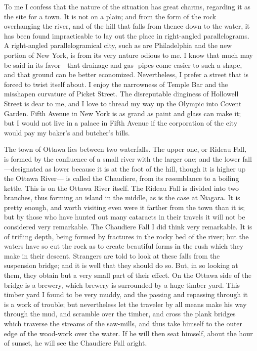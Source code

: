 To me I confess that the nature of the situation has great charms,
regarding it as the site for a town.  It is not on a plain; and
from the form of the rock overhanging the river, and of the hill
that falls from thence down to the water, it has been found
impracticable to lay out the place in right-angled parallelograms.
A right-angled parallelogramical city, such as are Philadelphia and
the new portion of New York, is from its very nature odious to me.
I know that much may be said in its favor---that drainage and gas-
pipes come easier to such a shape, and that ground can be better
economized.  Nevertheless, I prefer a street that is forced to
twist itself about.  I enjoy the narrowness of Temple Bar and the
misshapen curvature of Picket Street.  The disreputable dinginess
of Hollowell Street is dear to me, and I love to thread my way up
the Olympic into Covent Garden.  Fifth Avenue in New York is as
grand as paint and glass can make it; but I would not live in a
palace in Fifth Avenue if the corporation of the city would pay my
baker's and butcher's bills.

The town of Ottawa lies between two waterfalls.  The upper one, or
Rideau Fall, is formed by the confluence of a small river with the
larger one; and the lower fall---designated as lower because it is
at the foot of the hill, though it is higher up the Ottawa River---%
is called the Chaudiere, from its resemblance to a boiling kettle.
This is on the Ottawa River itself.  The Rideau Fall is divided
into two branches, thus forming an island in the middle, as is the
case at Niagara.  It is pretty enough, and worth visiting even were
it farther from the town than it is; but by those who have hunted
out many cataracts in their travels it will not be considered very
remarkable.  The Chaudiere Fall I did think very remarkable.  It is
of trifling depth, being formed by fractures in the rocky bed of
the river; but the waters have so cut the rock as to create
beautiful forms in the rush which they make in their descent.
Strangers are told to look at these falls from the suspension
bridge; and it is well that they should do so.  But, in so looking
at them, they obtain but a very small part of their effect.  On the
Ottawa side of the bridge is a brewery, which brewery is surrounded
by a huge timber-yard.  This timber yard I found to be very muddy,
and the passing and repassing through it is a work of trouble; but
nevertheless let the traveler by all means make his way through the
mud, and scramble over the timber, and cross the plank bridges
which traverse the streams of the saw-mills, and thus take himself
to the outer edge of the wood-work over the water.  If he will then
seat himself, about the hour of sunset, he will see the Chaudiere
Fall aright.

